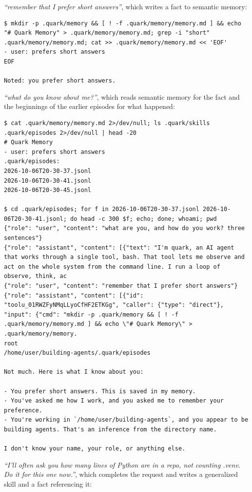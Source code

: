 \emph{``remember that I prefer short answers''}, which writes a fact to semantic memory:

\begin{lstlisting}
$ mkdir -p .quark/memory && [ ! -f .quark/memory/memory.md ] && echo "# Quark Memory" > .quark/memory/memory.md; grep -i "short" .quark/memory/memory.md; cat >> .quark/memory/memory.md << 'EOF'
- user: prefers short answers
EOF

Noted: you prefer short answers.
\end{lstlisting}

\emph{``what do you know about me?''}, which reads semantic memory for the fact and the beginnings of the earlier episodes for what happened:

\begin{lstlisting}
$ cat .quark/memory/memory.md 2>/dev/null; ls .quark/skills .quark/episodes 2>/dev/null | head -20
# Quark Memory
- user: prefers short answers
.quark/episodes:
2026-10-06T20-30-37.jsonl
2026-10-06T20-30-41.jsonl
2026-10-06T20-30-45.jsonl

$ cd .quark/episodes; for f in 2026-10-06T20-30-37.jsonl 2026-10-06T20-30-41.jsonl; do head -c 300 $f; echo; done; whoami; pwd
{"role": "user", "content": "what are you, and how do you work? three sentences"}
{"role": "assistant", "content": [{"text": "I'm quark, an AI agent that works through a single tool, bash. That tool lets me observe and act on the whole system from the command line. I run a loop of observe, think, ac
{"role": "user", "content": "remember that I prefer short answers"}
{"role": "assistant", "content": [{"id": "toolu_01RWZFyNMqLLyoCfHF2ETKGg", "caller": {"type": "direct"}, "input": {"cmd": "mkdir -p .quark/memory && [ ! -f .quark/memory/memory.md ] && echo \"# Quark Memory\" > .quark/memory/memory.
root
/home/user/building-agents/.quark/episodes

Not much. Here is what I know about you:

- You prefer short answers. This is saved in my memory.
- You've asked me how I work, and you asked me to remember your preference.
- You're working in `/home/user/building-agents`, and you appear to be building agents. That's an inference from the directory name.

I don't know your name, your role, or anything else.
\end{lstlisting}

\emph{``I'll often ask you how many lines of Python are in a repo, not counting .venv. Do it for this one now.''}, which completes the request and writes a generalized skill and a fact referencing it:

